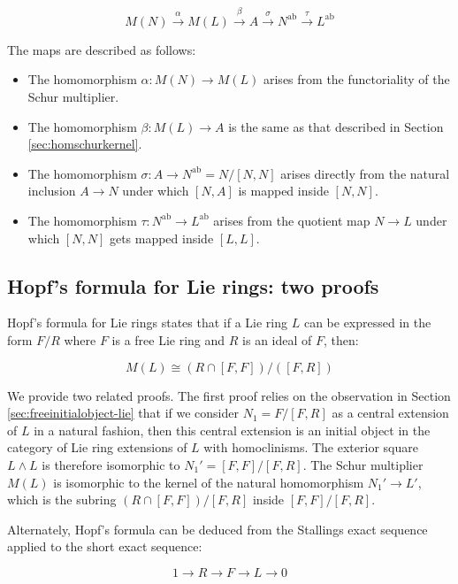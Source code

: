 \documentclass{ucetd}
\begin{document}
$$M(N) \stackrel{\alpha}{\to} M(L) \stackrel{\beta}{\to} A \stackrel{\sigma}{\to} N^{\operatorname{ab}} \stackrel{\tau}{\to} L^{\operatorname{ab}}$$

The maps are described as follows:

\begin{itemize}
\item The homomorphism $\alpha:M(N) \to M(L)$ arises from the
  functoriality of the Schur multiplier.
\item The homomorphism $\beta:M(L) \to A$ is the same as that
  described in Section \ref{sec:homschurkernel}.
\item The homomorphism $\sigma:A \to N^{\operatorname{ab}} = N/[N,N]$
  arises directly from the natural inclusion $A \to N$ under which
  $[N,A]$ is mapped inside $[N,N]$.
\item The homomorphism $\tau:N^{\operatorname{ab}} \to
  L^{\operatorname{ab}}$ arises from the quotient map $N \to L$ under
  which $[N,N]$ gets mapped inside $[L,L]$.
\end{itemize}

\subsection{Hopf's formula for Lie rings: two proofs}\label{sec:hopf-formula-proofs-lie}

Hopf's formula for Lie rings states that if a Lie ring $L$ can be
expressed in the form $F/R$ where $F$ is a free Lie ring and $R$ is an
ideal of $F$, then:

\begin{equation}\label{eq:hopf-formula-lie}
  M(L) \cong (R \cap [F,F])/([F,R])
\end{equation}

We provide two related proofs. The first proof relies on the
observation in Section \ref{sec:freeinitialobject-lie}
that if we consider $N_1 = F/[F,R]$ as a central extension of $L$ in a
natural fashion, then this central extension is an initial object in
the category of Lie ring extensions of $L$ with homoclinisms. The
exterior square $L \wedge L$ is therefore isomorphic to $N_1' =
[F,F]/[F,R]$. The Schur multiplier $M(L)$ is isomorphic to the kernel
of the natural homomorphism $N_1' \to L'$, which is the subring $(R
\cap [F,F])/[F,R]$ inside $[F,F]/[F,R]$.

Alternately, Hopf's formula can be deduced from the Stallings exact
sequence applied to the short exact sequence:

$$1 \to R \to F \to L \to 0$$
\end{document}
